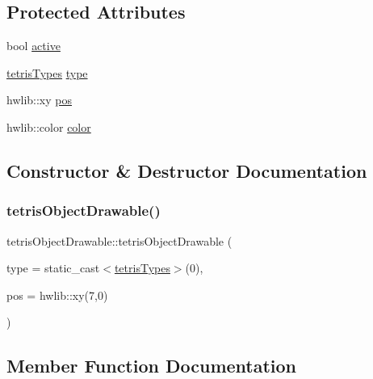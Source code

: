 \subsection*{Protected Attributes}
\begin{DoxyCompactItemize}
\item 
bool \hyperlink{classtetrisObjectDrawable_a0514772753a8926f5dcbf3d5384d486a}{active}
\item 
\hyperlink{enums_8hpp_aa2b983d3f5fee7f17796e5ef5040d787}{tetris\+Types} \hyperlink{classtetrisObjectDrawable_a0166b001667649c81bc968b4094ee557}{type}
\item 
hwlib\+::xy \hyperlink{classtetrisObjectDrawable_a53668abad09e9ec1cfca2b455cbe44f1}{pos}
\item 
hwlib\+::color \hyperlink{classtetrisObjectDrawable_a1093d07485e1cae9c91bd52cb423ccd1}{color}
\end{DoxyCompactItemize}


\subsection{Constructor \& Destructor Documentation}
\mbox{\label{classtetrisObjectDrawable_a88661f3ddd7ec7330c4867f545f54780}} 
\subsubsection{\texorpdfstring{tetris\+Object\+Drawable()}{tetrisObjectDrawable()}}
{\footnotesize\ttfamily tetris\+Object\+Drawable\+::tetris\+Object\+Drawable (\begin{DoxyParamCaption}\item[{\hyperlink{enums_8hpp_aa2b983d3f5fee7f17796e5ef5040d787}{tetris\+Types}}]{type = {\ttfamily static\+\_\+cast$<$\hyperlink{enums_8hpp_aa2b983d3f5fee7f17796e5ef5040d787}{tetris\+Types}$>$(0)},  }\item[{hwlib\+::xy}]{pos = {\ttfamily hwlib\+:\+:xy(7,0)} }\end{DoxyParamCaption})\hspace{0.3cm}{\ttfamily [inline]}}



\subsection{Member Function Documentation}
\mbox{\label{classtetrisObjectDrawable_a8a8d34133c0b548220e956f1a2a7ebb0}} 
